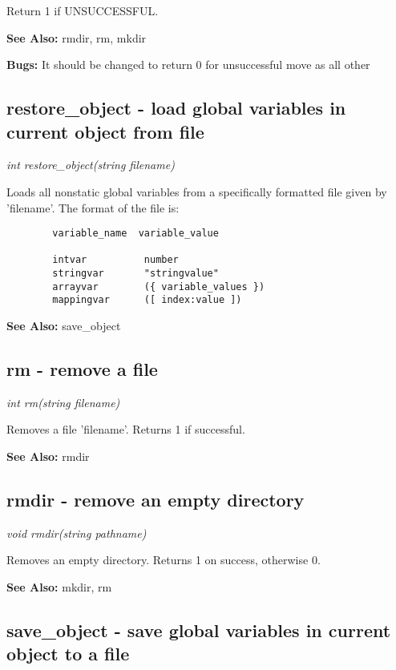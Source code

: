     Return 1 if UNSUCCESSFUL.

    {\bf See Also: }    rmdir, rm, mkdir

    {\bf Bugs: }    It should be changed to return 0 for unsuccessful move as all other


\subsection{restore\_object - load global variables in current object from file}

    {\em int restore\_object(string filename)}

    Loads all nonstatic global variables from a specifically formatted
    file given by 'filename'. The format of the file is:
    
    \begin{verbatim}
        variable_name  variable_value

        intvar          number
        stringvar       "stringvalue"
        arrayvar        ({ variable_values })
        mappingvar      ([ index:value ])
    \end{verbatim}

    {\bf See Also: }    save\_object


\subsection{rm - remove a file}

    {\em int rm(string filename)}

    Removes a file 'filename'. Returns 1 if successful.

    {\bf See Also: }    rmdir



\subsection{rmdir - remove an empty directory}

    {\em void rmdir(string pathname)}

    Removes an empty directory. Returns 1 on success, otherwise 0.

    {\bf See Also: }    mkdir, rm



\subsection{save\_object - save global variables in current object to a file}

